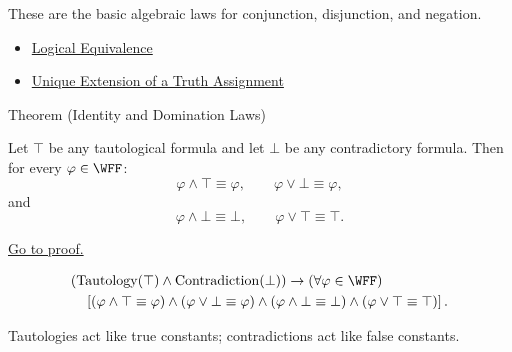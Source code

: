 \begin{remark*}[Interpretation]
These are the basic algebraic laws for conjunction, disjunction, and negation.
\end{remark*}

\begin{dependencies}
\begin{itemize}
  \item \hyperref[def:logical-equivalence-propositional-logic]{Logical Equivalence}
  \item \hyperref[thm:unique-extension-truth-assignment-propositional-logic]{Unique Extension of a Truth Assignment}
\end{itemize}
\end{dependencies}
\begin{theorembox}{Theorem (Identity and Domination Laws)}
\begin{theorem}
\label{thm:identity-domination-laws-propositional-logic}
Let \(\top\) be any tautological formula and let \(\bot\) be any contradictory formula. Then for every \(\varphi\in\WFF\):
\[
\varphi\land\top\equiv\varphi,
\qquad
\varphi\lor\bot\equiv\varphi,
\]
and
\[
\varphi\land\bot\equiv\bot,
\qquad
\varphi\lor\top\equiv\top.
\]

\noindent\hyperref[prf:identity-domination-laws-propositional-logic]{Go to proof.}
\end{theorem}
\end{theorembox}

\begin{remark*}
\[
\begin{aligned}
&(\operatorname{Tautology}(\top)\land \operatorname{Contradiction}(\bot))
\to
(\forall\varphi\in\WFF)\\
&\quad
\left[
(\varphi\land\top\equiv\varphi)
\land
(\varphi\lor\bot\equiv\varphi)
\land
(\varphi\land\bot\equiv\bot)
\land
(\varphi\lor\top\equiv\top)
\right].
\end{aligned}
\]
\end{remark*}

\begin{remark*}[Interpretation]
Tautologies act like true constants; contradictions act like false constants.
\end{remark*}

